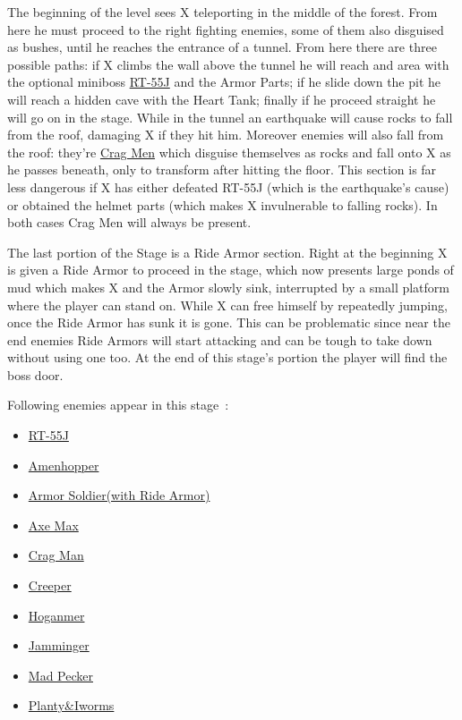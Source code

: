 The beginning of the level sees X teleporting in the middle of the forest. From here he must proceed to the right fighting enemies, some of them also disguised as bushes, until he reaches the entrance of a tunnel. From here there are three possible paths: if X climbs the wall above the tunnel he will reach and area with the optional miniboss \hyperlink{miniboss:RT-55J}{RT-55J} and the Armor Parts; if he slide down the pit he will reach a hidden cave with the Heart Tank; finally if he proceed straight he will go on in the stage. While in the tunnel an earthquake will cause rocks to fall from the roof, damaging X if they hit him. Moreover enemies will also fall from the roof: they're \hyperlink{enem:Crag_Man}{Crag Men} which disguise themselves as rocks and fall onto X as he passes beneath, only to transform after hitting the floor. This section is far less dangerous if X has either defeated RT-55J (which is the earthquake's cause) or obtained the helmet parts (which makes X invulnerable to falling rocks). In both cases Crag Men will always be present.

The last portion of the Stage is a Ride Armor section. Right at the beginning X is given a Ride Armor to proceed in the stage, which now presents large ponds of mud which makes X and the Armor slowly sink, interrupted by a small platform where the player can stand on. While X can free himself by repeatedly jumping, once the Ride Armor has sunk it is gone. This can be problematic since near the end enemies Ride Armors will start attacking and can be tough to take down without using one too. At the end of this stage's portion the player will find the boss door.

Following enemies appear in this stage~\cite{wiki:Forest}:
\begin{itemize}
	\item \hyperlink {miniboss:RT-55J}{RT-55J}
	\item \hyperlink {enem:Amenhopper} {Amenhopper}
	\item \hyperlink {enem:Armor_Soldier} {Armor Soldier(with Ride Armor)}
	\item \hyperlink {enem:Axe_Max} {Axe Max}
	\item \hyperlink {enem:Crag_Man} {Crag Man}
	\item \hyperlink {enem:Creeper} {Creeper}
	\item \hyperlink {enem:Hoganmer} {Hoganmer}
	\item \hyperlink {enem:Jamminger} {Jamminger}
	\item \hyperlink {enem:Mad_Pecker} {Mad Pecker}
	\item \hyperlink {enem:Planty_Iworms} {Planty\&Iworms}
\end{itemize}

